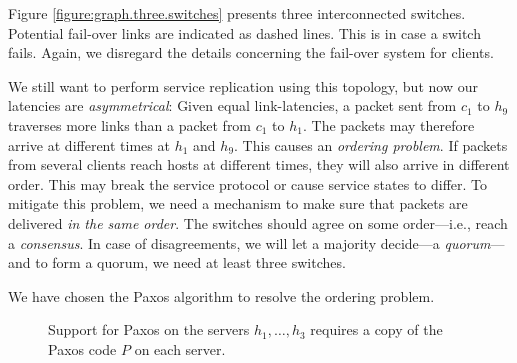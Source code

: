 Figure \vref{figure:graph.three.switches} presents three interconnected
switches.
%
Potential fail-over links are indicated as dashed lines.  This is in case
a switch fails.  Again, we disregard the details concerning the fail-over
system for clients.

We still want to perform service replication using this topology, but now our
latencies are \textit{asymmetrical}:
%
Given equal link-latencies, a packet sent from $c_1$ to $h_9$ traverses more links than a packet from
$c_1$ to $h_1$.  The packets may therefore
arrive at different times at $h_1$ and $h_9$.
%
This causes an \textit{ordering problem}. If packets from several clients
reach hosts at different times, they will also arrive in different order.
This may break the service protocol or cause service states to differ.
%
To mitigate this problem, we need a mechanism to make sure that packets are
delivered \textit{in the same order}.
%
The switches should agree on some order---i.e., reach a \textit{consensus}.
In case of disagreements, we will let a majority decide---a
\textit{quorum}---and to form a quorum, we need at least three switches.

We have chosen the Paxos algorithm to resolve the ordering problem.

\begin{figure}[H]
  \centering
  \caption{Support for Paxos on the servers $h_1, \dots, h_3$ requires a
    copy of the Paxos code $P$ on each server.}
  \label{figure:paxos.on.servers}
\end{figure}

